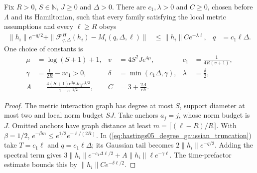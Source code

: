 \begin{lemma}
    \label{thm:hastings05_metric_filter_budget}
    \leanok
    Fix $R>0$, $S\in\mathbb N$, $J\ge0$ and $\Delta>0$. There are
    $c_1,\lambda>0$ and $C\ge0$, chosen before $\Lambda$ and its
    Hamiltonian, such that every family satisfying the local metric
    assumptions and every $\ell\ge R$ obeys
    \begin{align}
        \|h_i\|e^{-q/2}
        +\|\mathcal F_{q,\Delta}^{H}(h_i)-M_i(q,\Delta,\ell)\|
         & \le\|h_i\|C e^{-\lambda\ell},
         & q                             & =c_1\ell\Delta.
        \label{eq:hastings05_metric_filter_budget}
    \end{align}
    One choice of constants is
    \begin{align}
        \mu    & =\log(S+1)+1,                                  & v                          & =4S^2Je^{4\mu},
               & c_1                                            & =\frac1{4R(v+1)},\nonumber                           \\
        \gamma & =\frac1{2R}-vc_1>0,                            &
        \delta & =\min(c_1\Delta,\gamma),                       & \lambda                    & =\frac\delta2,\nonumber \\
        A      & =\frac{4(S+1)e^{5\mu}Jc_1e^{1/2}}{1-e^{-1/2}}, &
        C      & =3+\frac{2A}{e\delta}.
        \label{eq:hastings05_metric_filter_constants}
    \end{align}
\end{lemma}
\begin{proof}\leanok
    The metric interaction graph has degree at most $S$, support diameter
    at most two and local norm budget $SJ$. Take anchors $a_j=j$, whose
    norm budget is $J$. Omitted anchors have graph distance at least
    $m=\lceil(\ell-R)/R\rceil$. With $\beta=1/2$,
    $e^{-\beta m}\le e^{1/2}e^{-\ell/(2R)}$.
    In (\ref{eq:hastings05_degree_gaussian_truncation}) take
    $T=c_1\ell$ and $q=c_1\ell\Delta$; its Gaussian tail becomes
    $2\|h_i\|e^{-q/2}$. Adding the spectral term gives
    $3\|h_i\|e^{-c_1\Delta\ell/2}+A\|h_i\|\ell e^{-\gamma\ell}$.
    The time-prefactor estimate bounds this by
    $\|h_i\|C e^{-\delta\ell/2}$.
\end{proof}

